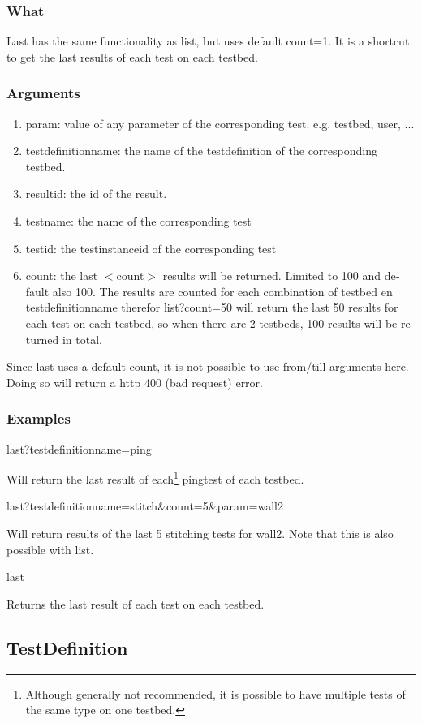 \begin{otherlanguage}{english}
\subsubsection{What}
Last has the same functionality as list, but uses default count=1. It is a shortcut to get the last results of each test on each testbed.
\subsubsection{Arguments}
\begin{enumerate}
\item param: value of any parameter of the corresponding test. e.g. testbed, user, ...
\item testdefinitionname: the name of the testdefinition of the corresponding testbed.
\item resultid: the id of the result.
\item testname: the name of the corresponding test
\item testid: the testinstanceid of the corresponding test
\item count: the last $<$count$>$ results will be returned. Limited to 100 and default also 100. The results are counted for each combination of testbed en testdefinitionname therefor list?count=50 will return the last 50 results for each test on each testbed, so when there are 2 testbeds, 100 results will be returned in total.
\end{enumerate}
\npar
Since last uses a default count, it is not possible to use from/till arguments here. Doing so will return a http 400 (bad request) error.
\subsubsection{Examples}
\begin{lt}
last?testdefinitionname=ping
\end{lt}
Will return the last result of each\footnote{Although generally not recommended, it is possible to have multiple tests of the same type on one testbed.} pingtest of each testbed.
\npar
\begin{lt}
last?testdefinitionname=stitch&count=5&param=wall2
\end{lt}
Will return results of the last 5 stitching tests for wall2. Note that this is also possible with list.
\npar
\begin{lt}
last
\end{lt}
Returns the last result of each test on each testbed.
\clearpage
\subsection{TestDefinition}

\end{otherlanguage}
